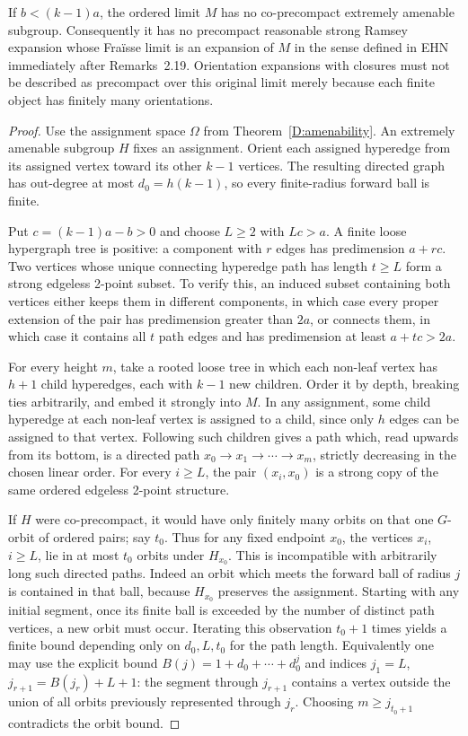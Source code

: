 \begin{theorem}
\label{D:no-precompact}
If $b<(k-1)a$, the ordered limit $M$ has no co-precompact extremely
amenable subgroup. Consequently it has no precompact reasonable
strong Ramsey expansion whose Fra\"isse limit is an expansion of
$M$ in the sense defined in EHN immediately after Remarks~2.19. Orientation expansions
with closures must not be described as precompact over this original
limit merely because each finite object has finitely many orientations.
\end{theorem}
\begin{proof}
Use the assignment space $\Omega$ from
Theorem~\ref{D:amenability}. An extremely amenable subgroup $H$
fixes an assignment. Orient each assigned hyperedge from its assigned
vertex toward its other $k-1$ vertices. The resulting directed graph
has out-degree at most $d_0=h(k-1)$, so every finite-radius forward
ball is finite.

Put $c=(k-1)a-b>0$ and choose $L\geq2$ with $Lc>a$.
A finite loose hypergraph tree is positive: a component with $r$
edges has predimension $a+rc$. Two vertices whose unique connecting
hyperedge path has length $t\geq L$ form a strong edgeless
2-point subset. To verify this, an induced subset containing both
vertices either keeps them in different components, in which case
every proper extension of the pair has predimension greater than
$2a$, or connects them, in which case it contains all $t$ path
edges and has predimension at least $a+tc>2a$.

For every height $m$, take a rooted loose tree in which each
non-leaf vertex has $h+1$ child hyperedges, each with $k-1$ new
children. Order it by depth, breaking ties arbitrarily, and embed
it strongly into $M$. In any assignment, some child hyperedge at
each non-leaf vertex is assigned to a child, since only $h$ edges
can be assigned to that vertex. Following such children gives a
path which, read upwards from its bottom, is a directed path
$x_0\to x_1\to\cdots\to x_m$, strictly decreasing in the chosen
linear order. For every $i\geq L$, the pair $(x_i,x_0)$ is a
strong copy of the same ordered edgeless 2-point structure.

If $H$ were co-precompact, it would have only finitely many orbits
on that one $G$-orbit of ordered pairs; say $t_0$. Thus for any
fixed endpoint $x_0$, the vertices $x_i$, $i\geq L$, lie in
at most $t_0$ orbits under $H_{x_0}$. This is incompatible with
arbitrarily long such directed paths. Indeed an orbit which meets
the forward ball of radius $j$ is contained in that ball, because
$H_{x_0}$ preserves the assignment. Starting with any initial
segment, once its finite ball is exceeded by the number of distinct
path vertices, a new orbit must occur. Iterating this observation
$t_0+1$ times yields a finite bound depending only on $d_0,L,t_0$
for the path length. Equivalently one may use the explicit bound
$B(j)=1+d_0+\cdots+d_0^j$ and indices
$j_1=L$, $j_{r+1}=B(j_r)+L+1$: the segment through $j_{r+1}$
contains a vertex outside the union of all orbits previously
represented through $j_r$. Choosing $m\geq j_{t_0+1}$ contradicts
the orbit bound.


\end{proof}

